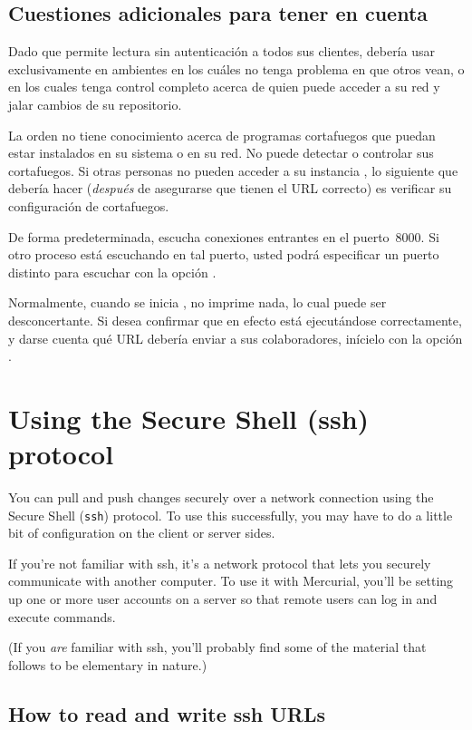 \subsection{Cuestiones adicionales para tener en cuenta}

Dado que permite lectura sin autenticación a todos sus clientes,
debería usar  exclusivamente en ambientes en los cuáles
no tenga problema en que otros vean, o en los cuales tenga control
completo acerca de quien puede acceder a su red y jalar cambios de su
repositorio.

La orden  no tiene conocimiento acerca de programas
cortafuegos que puedan estar instalados en su sistema o en su red. No
puede detectar o controlar sus cortafuegos.  Si otras personas no
pueden acceder a su instancia , lo siguiente que debería hacer
(\emph{después} de asegurarse que tienen el URL correcto) es verificar
su configuración de cortafuegos.

De forma predeterminada,  escucha conexiones entrantes en
el puerto~8000.  Si otro proceso está escuchando en tal puerto, usted
podrá especificar un puerto distinto para escuchar con la opción
 .

Normalmente, cuando se inicia , no imprime nada, lo cual
puede ser desconcertante.  Si desea confirmar que en efecto está
ejecutándose correctamente, y darse cuenta qué URL debería enviar a
sus colaboradores, inícielo con la opción .

\section{Using the Secure Shell (ssh) protocol}
\label{sec:collab:ssh}

You can pull and push changes securely over a network connection using
the Secure Shell (\texttt{ssh}) protocol.  To use this successfully,
you may have to do a little bit of configuration on the client or
server sides.

If you're not familiar with ssh, it's a network protocol that lets you
securely communicate with another computer.  To use it with Mercurial,
you'll be setting up one or more user accounts on a server so that
remote users can log in and execute commands.

(If you \emph{are} familiar with ssh, you'll probably find some of the
material that follows to be elementary in nature.)

\subsection{How to read and write ssh URLs}

